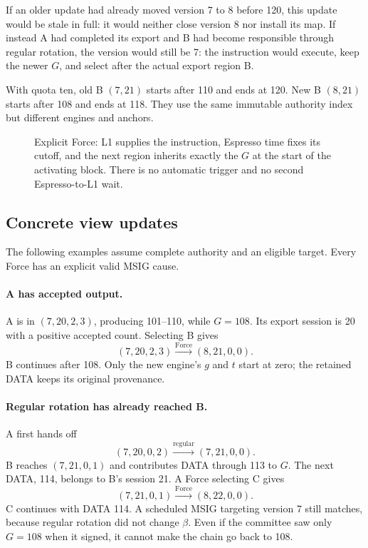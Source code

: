 \documentclass[11pt,a4paper]{article}
\begin{document}
If an older update had already moved version 7 to 8 before 120, this
update would be stale in full: it would neither close version 8 nor
install its map. If instead A had completed its export and B had become
responsible through regular rotation, the version would still be 7: the
instruction would execute, keep the newer $G$, and select after the
actual export region B.

With quota ten, old B $(7,21)$ starts after 110 and ends at 120. New B
$(8,21)$ starts after 108 and ends at 118. They use the same immutable
authority index but different engines and anchors.

\begin{figure}[p]\centering

\caption{Explicit Force: L1 supplies the instruction, Espresso time fixes
its cutoff, and the next region inherits exactly the $G$ at the start of
the activating block. There is no automatic trigger and no second
Espresso-to-L1 wait.}
\label{fig:forced-cross-region}
\end{figure}
\FloatBarrier

\subsection{Concrete view updates}
\label{sec:force-view-examples}
The following examples assume complete authority and an eligible target.
Every Force has an explicit valid MSIG cause.

\paragraph{A has accepted output.}
A is in $(7,20,2,3)$, producing 101--110, while $G=108$. Its export
session is 20 with a positive accepted count. Selecting B gives
\[
 (7,20,2,3)\xrightarrow{\mathrm{Force}}(8,21,0,0).
\]
B continues after 108. Only the new engine's $g$ and $t$ start at zero;
the retained DATA keeps its original provenance.

\paragraph{Regular rotation has already reached B.}
A first hands off
\[
 (7,20,0,2)\xrightarrow{\mathrm{regular}}(7,21,0,0).
\]
B reaches $(7,21,0,1)$ and contributes DATA through 113 to $G$. The next
DATA, 114, belongs to B's session 21. A Force selecting C gives
\[
 (7,21,0,1)\xrightarrow{\mathrm{Force}}(8,22,0,0).
\]
C continues with DATA 114. A scheduled MSIG targeting version 7 still
matches, because regular rotation did not change $\beta$. Even if the
committee saw only $G=108$ when it signed, it cannot make the chain go
back to 108.
\end{document}

